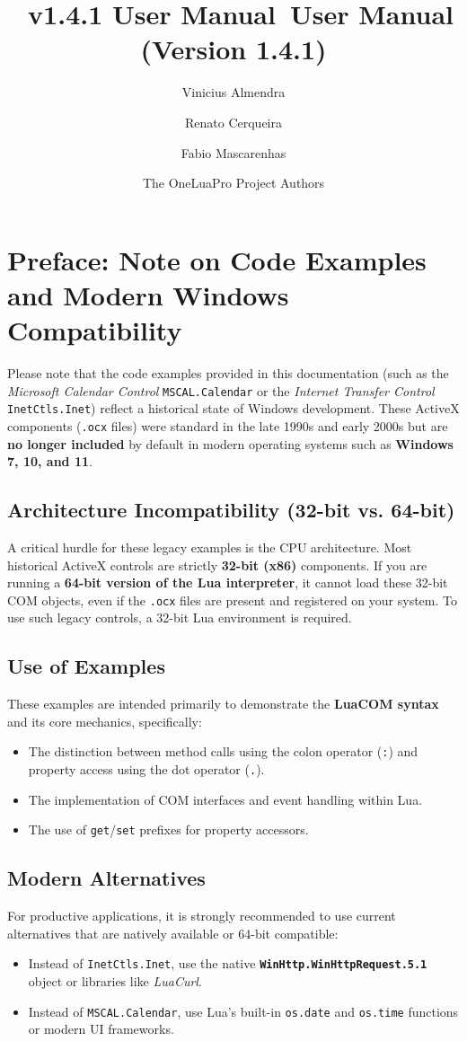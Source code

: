 \documentclass[11pt,a4paper,english]{report}
\title{\luacom  \ v1.4.1 User Manual}
\title{\luacom \ User Manual \\
{\small (Version 1.4.1)}}
\author{Vinicius Almendra \and Renato Cerqueira \and Fabio Mascarenhas \and
  The OneLuaPro Project Authors}
\begin{document}
\maketitle

\chapter*{Preface: Note on Code Examples and Modern Windows Compatibility}

Please note that the code examples provided in this documentation
(such as the \textit{Microsoft Calendar Control}
\texttt{MSCAL.Calendar} or the \textit{Internet Transfer Control}
\texttt{InetCtls.Inet}) reflect a historical state of Windows
development. These ActiveX components (\texttt{.ocx} files) were
standard in the late 1990s and early 2000s but are \textbf{no longer
  included} by default in modern operating systems such as
\textbf{Windows 7, 10, and 11}.

\section*{Architecture Incompatibility (32-bit vs. 64-bit)}
A critical hurdle for these legacy examples is the CPU
architecture. Most historical ActiveX controls are strictly
\textbf{32-bit (x86)} components. If you are running a \textbf{64-bit
  version of the Lua interpreter}, it cannot load these 32-bit COM
objects, even if the \texttt{.ocx} files are present and registered on
your system. To use such legacy controls, a 32-bit Lua environment is
required.

\section*{Use of Examples}
These examples are intended primarily to demonstrate the
\textbf{LuaCOM syntax} and its core mechanics, specifically:
\begin{itemize}
\item The distinction between method calls using the colon operator
  (\texttt{:}) and property access using the dot operator
  (\texttt{.}).
\item The implementation of COM interfaces and event handling within
  Lua.
\item The use of \texttt{get}/\texttt{set} prefixes for property
  accessors.
\end{itemize}

\section*{Modern Alternatives}
For productive applications, it is strongly recommended to use current
alternatives that are natively available or 64-bit compatible:
\begin{itemize}
\item Instead of \texttt{InetCtls.Inet}, use the native
  \textbf{\texttt{WinHttp.WinHttpRequest.5.1}} object or libraries
  like \textit{LuaCurl}.
\item Instead of \texttt{MSCAL.Calendar}, use Lua's built-in
  \texttt{os.date} and \texttt{os.time} functions or modern UI
  frameworks.
\end{itemize}
\end{document}
